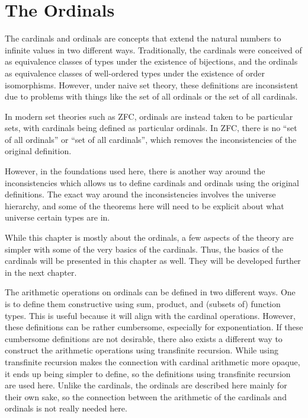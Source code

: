\documentclass[../../math.tex]{subfiles}
\begin{document}
\setcounter{chapter}{8}

\chapter{The Ordinals}

The cardinals and ordinals are concepts that extend the natural numbers to
infinite values in two different ways.  Traditionally, the cardinals were
conceived of as equivalence classes of types under the existence of bijections,
and the ordinals as equivalence classes of well-ordered types under the
existence of order isomorphisms.  However, under naive set theory, these
definitions are inconsistent due to problems with things like the set of all
ordinals or the set of all cardinals.

In modern set theories such as ZFC, ordinals are instead taken to be particular
sets, with cardinals being defined as particular ordinals.  In ZFC, there is no
``set of all ordinals'' or ``set of all cardinals'', which removes the
inconsistencies of the original definition.

However, in the foundations used here, there is another way around the
inconsistencies which allows us to define cardinals and ordinals using the
original definitions.  The exact way around the inconsistencies involves the
universe hierarchy, and some of the theorems here will need to be explicit about
what universe certain types are in.

While this chapter is mostly about the ordinals, a few aspects of the theory are
simpler with some of the very basics of the cardinals.  Thus, the basics of the
cardinals will be presented in this chapter as well.  They will be developed
further in the next chapter.

The arithmetic operations on ordinals can be defined in two different ways.  One
is to define them constructive using sum, product, and (subsets of) function
types.  This is useful because it will align with the cardinal operations.
However, these definitions can be rather cumbersome, especially for
exponentiation.  If these cumbersome definitions are not desirable, there also
exists a different way to construct the arithmetic operations using transfinite
recursion.  While using transfinite recursion makes the connection with cardinal
arithmetic more opaque, it ends up being simpler to define, so the definitions
using transfinite recursion are used here.  Unlike the cardinals, the ordinals
are described here mainly for their own sake, so the connection between the
arithmetic of the cardinals and ordinals is not really needed here.
\end{document}
